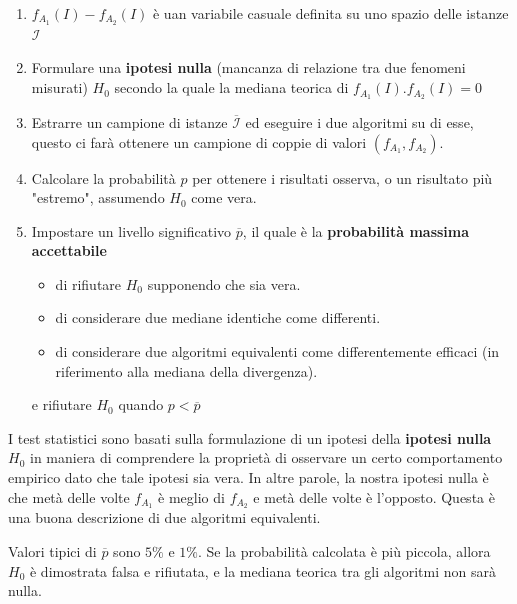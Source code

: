 \documentclass{article}
\newcommand{\ovcal}[1]{\overline{\mathcal{#1}}}
\begin{document}
\begin{enumerate}
    \item $f_{A_1}(I)-f_{A_2}(I)$ è uan variabile casuale definita su uno spazio delle istanze $\mathcal{I}$
    \item Formulare una \textbf{ipotesi nulla} (mancanza di relazione tra due fenomeni misurati) $H_0$
          secondo la quale la mediana teorica di $f_{A_1}(I).f_{A_2}(I)=0$
    \item Estrarre un campione di istanze $\ovcal{I}$ ed eseguire i due algoritmi su di esse, questo ci farà
          ottenere un campione di coppie di valori $(f_{A_1},f_{A_2})$.
    \item Calcolare la probabilità $p$ per ottenere i risultati osserva, o un risultato più "estremo",
          assumendo $H_0$ come vera.
    \item Impostare un livello significativo $\overline{p}$, il quale è la \textbf{probabilità massima accettabile}
          \begin{itemize}
              \item di rifiutare $H_0$ supponendo che sia vera.
              \item di considerare due mediane identiche come differenti.
              \item di considerare due algoritmi equivalenti come differentemente efficaci
                    (in riferimento alla mediana della divergenza).
          \end{itemize}
          e rifiutare $H_0$ quando $p<\overline{p}$
\end{enumerate}

I test statistici sono basati sulla formulazione di un ipotesi della \textbf{ipotesi nulla} $H_0$ in maniera
di comprendere la proprietà di osservare un certo comportamento empirico dato che tale ipotesi sia vera. In altre
parole, la nostra ipotesi nulla è che metà delle volte $f_{A_1}$ è meglio di $f_{A_2}$ e metà
delle volte è l'opposto. Questa è una buona  descrizione di due algoritmi equivalenti.

Valori tipici di $\overline{p}$ sono $5\%$ e $1\%$. Se la probabilità calcolata è più piccola,
allora $H_0$ è dimostrata falsa e rifiutata, e la mediana teorica tra gli algoritmi non sarà nulla.
\end{document}
